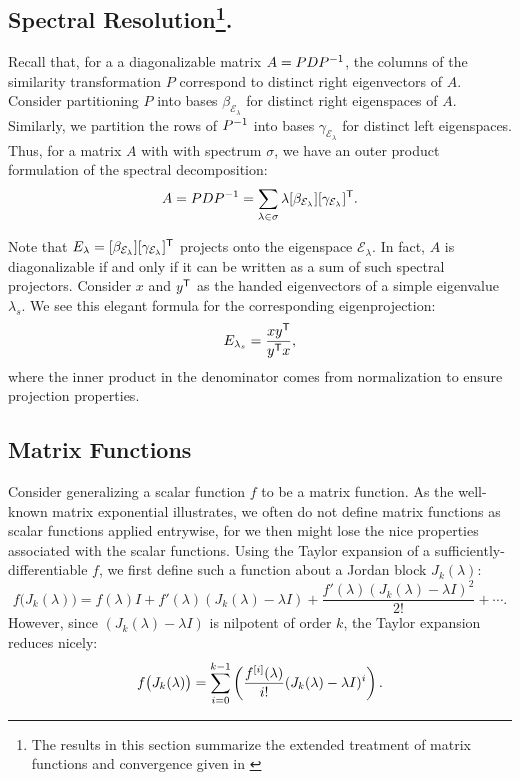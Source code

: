 \documentclass[../exploring-pagerank.tex]{subfiles}
\begin{document}
    \subsection{Spectral Resolution\protect\footnote{The results in this section summarize the extended treatment of matrix functions and convergence given in \cite{meyerMatrixAnalysisApplied2000}}.}
    Recall that, for a a diagonalizable matrix $A=PDP^{-1}$, the columns of the similarity transformation $P$ correspond to distinct right eigenvectors of $A$. Consider partitioning $P$ into bases $\beta_{\mathcal{E}_\lambda}$ for distinct right eigenspaces of $A$. Similarly, we partition the rows of $P^{-1}$ into bases $\gamma_{\mathcal{E}_\lambda}$ for distinct left eigenspaces. Thus, for a matrix $A$ with with spectrum $\sigma$, we have an outer product formulation of the spectral decomposition:
    \begin{equation}
        \label{eqn:spectral_decomposition}
        A = PDP^{-1} = \sum_{\lambda\in\sigma}{\lambda [\beta_{\mathcal{E}_\lambda}][\gamma_{\mathcal{E}_\lambda}]^{\mathsf{T}}}.
    \end{equation}
    
    Note that $E_\lambda = [\beta_{\mathcal{E}_\lambda}][\gamma_{\mathcal{E}_\lambda}]^{\mathsf{T}}$ projects onto the eigenspace $\mathcal{E}_\lambda$. In fact, $A$ is diagonalizable if and only if it can be written as a sum of such spectral projectors. Consider $x$ and $y^{\mathsf{T}}$ as the handed eigenvectors of a simple eigenvalue $\lambda_s$. We see this elegant formula for the corresponding eigenprojection:
    \begin{equation}
        \label{eqn:simple_eigenprojection}
        E_{\lambda_s} = \frac{x y^{\mathsf{T}}}{y^{\mathsf{T}} x},
    \end{equation}
    where the inner product in the denominator comes from normalization to ensure projection properties.
    
    \subsection{Matrix Functions}
	Consider generalizing a scalar function $f$ to be a matrix function. As the well-known matrix exponential illustrates, we often do not define matrix functions as scalar functions applied entrywise, for we then might lose the nice properties associated with the scalar functions. Using the Taylor expansion of a sufficiently-differentiable $f$, we first define such a function about a Jordan block $J_k(\lambda)$:
	\begin{equation*}
		f\big( J_k(\lambda) \big)=f(\lambda)I + f'(\lambda)(J_k(\lambda) - \lambda I) + \frac{f'(\lambda)(J_k(\lambda) - \lambda I)^2}{2!} + \cdots.
	\end{equation*}
	However, since $(J_k(\lambda) - \lambda I)$ is nilpotent of order $k$, the Taylor expansion reduces nicely:
	\begin{equation}
	    \label{eqn:f_jordan_block}
		f\big( J_k(\lambda) \big) = \sum_{i=0}^{k - 1}\left( \frac{f^{[i]}(\lambda)}{i!} (J_k(\lambda) - \lambda I)^i \right).
	\end{equation}
	
\end{document}
